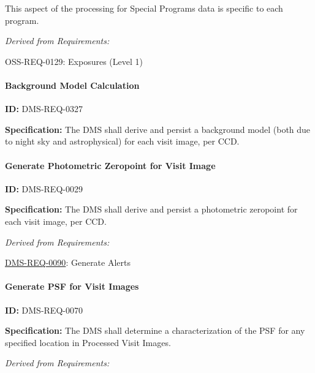 \documentclass[SE,toc,lsstdraft]{lsstdoc}
\begin{document}
This aspect of the processing for Special Programs data is specific to each program.




\emph{Derived from Requirements:}

OSS-REQ-0129:
Exposures (Level 1) \newline


\paragraph{Background Model Calculation}\hfill  %

\label{DMS-REQ-0327}
\textbf{ID:} DMS-REQ-0327

\textbf{Specification: }The DMS shall derive and persist a background model (both due to night sky and astrophysical) for each visit image, per CCD.







\paragraph{Generate Photometric Zeropoint for Visit Image}\hfill  %

\label{DMS-REQ-0029}
\textbf{ID:} DMS-REQ-0029

\textbf{Specification:} The DMS shall derive and persist a photometric zeropoint for each visit image, per CCD.






\emph{Derived from Requirements:}

\hyperref[DMS-REQ-0090]{DMS-REQ-0090}:
Generate Alerts \newline


\paragraph{Generate PSF for Visit Images}\hfill  %

\label{DMS-REQ-0070}
\textbf{ID:} DMS-REQ-0070

\textbf{Specification:} The DMS shall determine a characterization of the PSF for any specified location in Processed Visit Images.






\emph{Derived from Requirements:}
\end{document}
